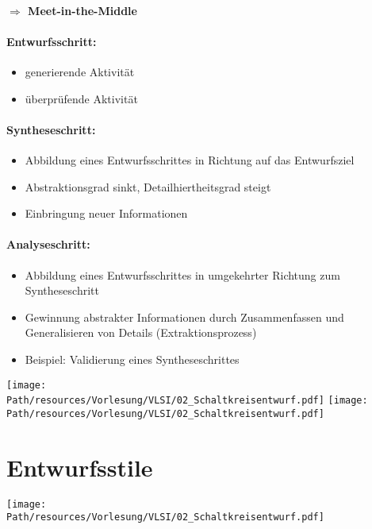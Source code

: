 	\paragraph{$\Rightarrow$ Meet-in-the-Middle}
	
	\paragraph{Entwurfsschritt:}
		\begin{itemize}
			\item generierende Aktivität
			\item überprüfende Aktivität
		\end{itemize}
	\paragraph{Syntheseschritt:}
		\begin{itemize}
			\item Abbildung eines Entwurfsschrittes in Richtung auf das Entwurfsziel
			\item Abstraktionsgrad sinkt, Detailhiertheitsgrad steigt
			\item Einbringung neuer Informationen
		\end{itemize}
	\paragraph{Analyseschritt:}
		\begin{itemize}
			\item Abbildung eines Entwurfsschrittes in umgekehrter Richtung zum Syntheseschritt
			\item Gewinnung abstrakter Informationen durch Zusammenfassen und Generalisieren von Details (Extraktionsprozess)
			\item Beispiel: Validierung eines Syntheseschrittes
		\end{itemize}
		
	\begin{center}
		\texttt{[image: \\Path/resources/Vorlesung/VLSI/02\_Schaltkreisentwurf.pdf]}
		\texttt{[image: \\Path/resources/Vorlesung/VLSI/02\_Schaltkreisentwurf.pdf]}
	\end{center}
	
\newpage
\section{Entwurfsstile}
	\begin{center}
		\texttt{[image: \\Path/resources/Vorlesung/VLSI/02\_Schaltkreisentwurf.pdf]}
	\end{center}
	
